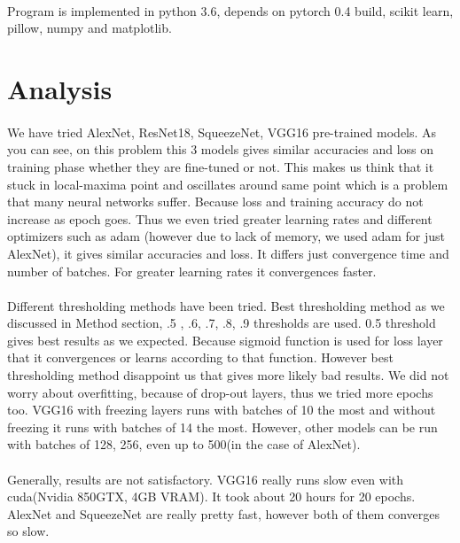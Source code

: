 \paragraph{}Program is implemented in python 3.6, depends on pytorch 0.4 build, scikit learn, pillow, numpy and matplotlib.

\section{Analysis}
\paragraph{} We have tried AlexNet, ResNet18, SqueezeNet, VGG16 pre-trained models. As you can see, on this problem this 3 models gives similar accuracies and loss on training phase whether they are fine-tuned or not. This makes us think that it stuck in local-maxima point and oscillates around same point which is a problem that many neural networks suffer. Because loss and training accuracy do not increase as epoch goes. Thus we even tried greater learning rates and different optimizers such as adam (however due to lack of memory, we used adam for just AlexNet), it gives similar accuracies and loss. It differs just convergence time and number of batches. For greater learning rates it convergences faster.

\paragraph{}Different thresholding methods have been tried. Best thresholding method as we discussed in Method section, .5 , .6, .7, .8, .9 thresholds are used. 0.5 threshold gives best results as we expected. Because sigmoid function is used for loss layer that it convergences or learns according to that function. However best thresholding method disappoint us that gives more likely bad results. We did not worry about overfitting, because of drop-out layers, thus we tried more epochs too. VGG16 with freezing layers runs with batches of 10 the most and without freezing it runs with batches of 14 the most. However, other models can be run with batches of 128, 256, even up to 500(in the case of AlexNet).  

\paragraph{}Generally, results are not satisfactory. VGG16 really runs slow even with cuda(Nvidia 850GTX, 4GB VRAM). It took about 20 hours for 20 epochs. AlexNet and SqueezeNet are really pretty fast, however both of them converges so slow.   

